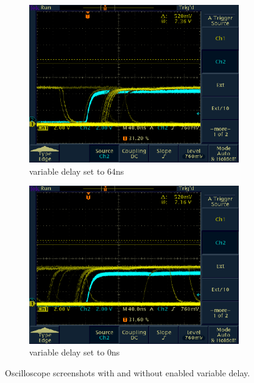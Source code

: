 \documentclass[11pt,a4paper,notitlepage]{scrartcl}
\begin{document}
\begin{figure}[H]
	\centering
	\begin{subfigure}{0.49\linewidth}
		\includegraphics[width=\linewidth]{figs/osci_pics/TEK00002.pdf}
		\caption{variable delay set to 64ns}
	\end{subfigure}
	\begin{subfigure}{0.49\linewidth}
		\includegraphics[width=\linewidth]{figs/osci_pics/TEK00003.pdf}
		\caption{variable delay set to 0ns}
	\end{subfigure}
	\caption{Oscilloscope screenshots with and without enabled variable delay.}\label{fig:CFD_trigger}
\end{figure}
\end{document}
